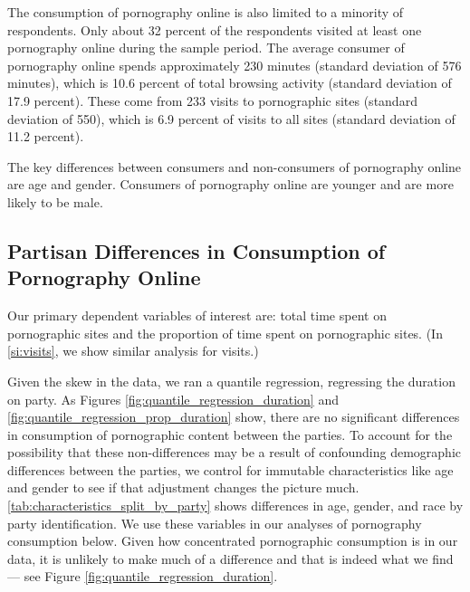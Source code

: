 \documentclass[12pt, letterpaper]{article}
\begin{document}
The consumption of pornography online is also limited to a minority of respondents. Only about 32 percent of the respondents visited at least one pornography online during the sample period. The average consumer of pornography online spends approximately 230 minutes (standard deviation of 576 minutes), which is 10.6 percent of total browsing activity (standard deviation of 17.9 percent). These come from 233 visits to pornographic sites (standard deviation of 550), which is 6.9 percent of visits to all sites (standard deviation of 11.2 percent).

The key differences between consumers and non-consumers of pornography online are age and gender. Consumers of pornography online are younger and are more likely to be male. 

\subsection*{Partisan Differences in Consumption of Pornography Online}

Our primary dependent variables of interest are: total time spent on pornographic sites and the proportion of time spent on pornographic sites. (In \ref{si:visits}, we show similar analysis for visits.)

Given the skew in the data, we ran a quantile regression, regressing the duration on party. As Figures \ref{fig:quantile_regression_duration} and \ref{fig:quantile_regression_prop_duration} show, there are no significant differences in consumption of pornographic content between the parties. To account for the possibility that these non-differences may be a result of confounding demographic differences between the parties, we control for immutable characteristics like age and gender to see if that adjustment changes the picture much. \cref{tab:characteristics_split_by_party} shows differences in age, gender, and race by party identification. We use these variables in our analyses of pornography consumption below. Given how concentrated pornographic consumption is in our data, it is unlikely to make much of a difference and that is indeed what we find --- see Figure \ref{fig:quantile_regression_duration}. 
\end{document}
